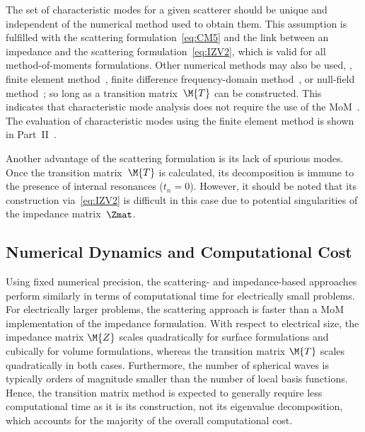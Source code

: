 \documentclass[journal]{IEEEtran}
\begin{document}
The set of characteristic modes for a given scatterer should be unique and independent of the numerical method used to obtain them. This assumption is fulfilled with the scattering formulation~\eqref{eq:CM5} and the link between an impedance and the scattering formulation~\eqref{eq:IZV2}, which is valid for all method-of-moments formulations. Other numerical methods may also be used, \eg{}, finite element method~\cite{Demesy+etal2018,Fruhnert+etal2017}, finite difference frequency-domain method~\cite{Loke+etal2007}, or null-field method~\cite{Mishchenko2020}; so long as a transition matrix~$\M{T}$ can be constructed. This indicates that characteristic mode analysis does not require the use of the \ac{MoM}~\cite{SarkarMokoleSalazarPalma_AnExposeOnInternalResonancesCM}. The evaluation of characteristic modes using the finite element method is shown in Part~II~\cite{Gustafsson+etal_CMT2_2021}.

Another advantage of the scattering formulation is its lack of spurious modes. Once the transition matrix~$\M{T}$ is calculated, its decomposition is immune to the presence of internal resonances ($t_n = 0$). However, it should be noted that its construction via~\eqref{eq:IZV2} is difficult in this case due to potential singularities of the impedance matrix~$\Zmat$.

\subsection{Numerical Dynamics and Computational Cost}
\label{sec:disc:dyn}

Using fixed numerical precision, the scattering- and impedance-based approaches perform similarly in terms of computational time for electrically small problems. For electrically larger problems, the scattering approach is faster than a \ac{MoM} implementation of the impedance formulation. With respect to electrical size, the impedance matrix $\M{Z}$ scales quadratically for surface formulations and cubically for volume formulations, whereas the transition matrix $\M{T}$ scales quadratically in both cases.
Furthermore, the number of spherical waves is typically orders of magnitude smaller than the number of local basis functions. Hence, the transition matrix method is expected to generally require less computational time as it is its construction, not its eigenvalue decomposition, which accounts for the majority of the overall computational cost.
\end{document}
